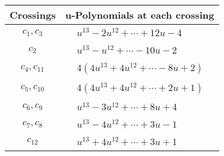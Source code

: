 \documentclass[1p]{elsarticle_modified}
\theoremstyle{definition}
\begin{document}
\begin{tabular}{m{50pt}|m{274pt}}
Crossings & \hspace{64pt}u-Polynomials at each crossing \\
\hline $$\begin{aligned}c_{1},c_{3}\end{aligned}$$&$\begin{aligned}
&u^{13}-2 u^{12}+\cdots+12 u-4
\end{aligned}$\\
\hline $$\begin{aligned}c_{2}\end{aligned}$$&$\begin{aligned}
&u^{13}- u^{12}+\cdots-10 u-2
\end{aligned}$\\
\hline $$\begin{aligned}c_{4},c_{11}\end{aligned}$$&$\begin{aligned}
&4(4 u^{13}+4 u^{12}+\cdots-8 u+2)
\end{aligned}$\\
\hline $$\begin{aligned}c_{5},c_{10}\end{aligned}$$&$\begin{aligned}
&4(4 u^{13}+4 u^{12}+\cdots+2 u+1)
\end{aligned}$\\
\hline $$\begin{aligned}c_{6},c_{9}\end{aligned}$$&$\begin{aligned}
&u^{13}-3 u^{12}+\cdots+8 u+4
\end{aligned}$\\
\hline $$\begin{aligned}c_{7},c_{8}\end{aligned}$$&$\begin{aligned}
&u^{13}-4 u^{12}+\cdots+3 u-1
\end{aligned}$\\
\hline $$\begin{aligned}c_{12}\end{aligned}$$&$\begin{aligned}
&u^{13}+4 u^{12}+\cdots+3 u+1
\end{aligned}$\\
\hline
\end{tabular}\\~\\
\newpage\renewcommand{\arraystretch}{1}
\end{document}
